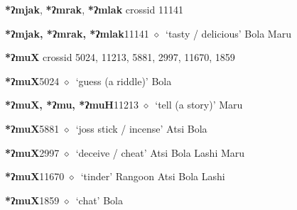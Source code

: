 \item
\textbf{*ʔmjak}, \textbf{*ʔmrak}, \textbf{*ʔmlak}
  {\tiny crossid 11141}
  \begin{list}{}{\leftmargin=1.5em \itemindent=-1.5em}
  \item {\footnotesize \textbf{*ʔmjak, *ʔmrak, *ʔmlak}}{\tiny 11141}
         $\diamond$~`tasty / delicious'
         Bola 
\hspace{1ex}
         Maru 
  \end{list}
\item
\textbf{*ʔmuX}
  {\tiny crossid 5024, 11213, 5881, 2997, 11670, 1859}
  \begin{list}{}{\leftmargin=1.5em \itemindent=-1.5em}
  \item {\footnotesize \textbf{*ʔmuX}}{\tiny 5024}
         $\diamond$~`guess (a riddle)'
         Bola 
  \item {\footnotesize \textbf{*ʔmuX, *ʔmu, *ʔmuH}}{\tiny 11213}
\hspace{1ex}
         $\diamond$~`tell (a story)'
         Maru 
  \item {\footnotesize \textbf{*ʔmuX}}{\tiny 5881}
\hspace{1ex}
         $\diamond$~`joss stick / incense'
         Atsi 
\hspace{1ex}
         Bola 
  \item {\footnotesize \textbf{*ʔmuX}}{\tiny 2997}
\hspace{1ex}
         $\diamond$~`deceive / cheat'
         Atsi 
\hspace{1ex}
         Bola 
\hspace{1ex}
         Lashi 
\hspace{1ex}
         Maru 
  \item {\footnotesize \textbf{*ʔmuX}}{\tiny 11670}
\hspace{1ex}
         $\diamond$~`tinder'
         Rangoon 
\hspace{1ex}
         Atsi 
\hspace{1ex}
         Bola 
\hspace{1ex}
         Lashi 
  \item {\footnotesize \textbf{*ʔmuX}}{\tiny 1859}
\hspace{1ex}
         $\diamond$~`chat'
         Bola 
  \end{list}
